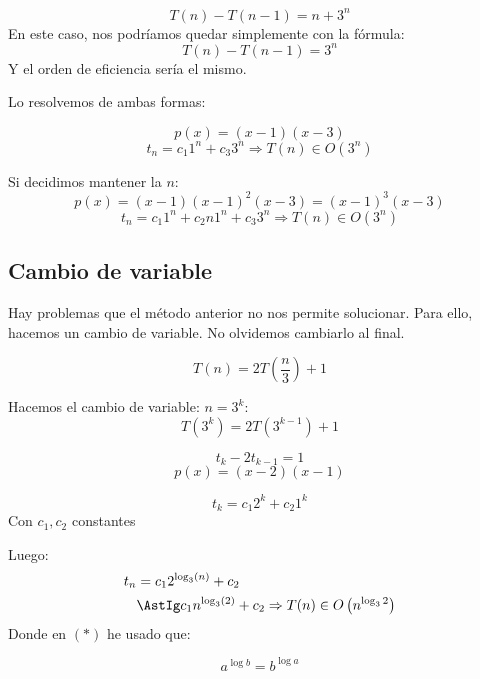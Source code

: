 \begin{ejemplo}
\begin{equation*}
    T(n) - T(n-1) = n+3^n
\end{equation*}
En este caso, nos podríamos quedar simplemente con la fórmula:
\begin{equation*}
    T(n) - T(n-1) = 3^n
\end{equation*}
Y el orden de eficiencia sería el mismo.

Lo resolvemos de ambas formas:

\begin{equation*}
    p(x) = (x-1)(x-3)
\end{equation*}
\begin{equation*}
    t_n = c_1 1^n + c_3 3^n \Rightarrow T(n) \in O(3^n)
\end{equation*}

Si decidimos mantener la $n$:
\begin{equation*}
    p(x) = (x-1)(x-1)^2 (x-3) = (x-1)^3(x-3)
\end{equation*}
\begin{equation*}
    t_n = c_1 1^n + c_2 n 1^n + c_3 3^n \Rightarrow T(n) \in O(3^n)
\end{equation*}
\end{ejemplo}

\subsection{Cambio de variable}
Hay problemas que el método anterior no nos permite solucionar. Para ello, hacemos un cambio de variable. No olvidemos cambiarlo al final.

\begin{ejemplo}
\begin{equation*}
    T(n) = 2T\left(\dfrac{n}{3}\right)+1
\end{equation*}

Hacemos el cambio de variable: $n = 3^k$:
\begin{equation*}
    T(3^k) = 2T(3^{k-1})+1
\end{equation*}

\begin{equation*}
    t_k - 2t_{k-1} = 1
\end{equation*}
\begin{equation*}
    p(x) = (x-2)(x-1)
\end{equation*}

\begin{equation*}
    t_k = c_1 2^k + c_2 1^k
\end{equation*}
Con $c_1, c_2$ constantes

Luego:
\begin{align*}
    t_n &= c_1 2^{\log_3(n)} + c_2\\
    &\AstIg c_1 n^{\log_3(2)} + c_2 \Rightarrow T(n) \in O\left(n^{\log_3 2}\right)
\end{align*}
Donde en $(\ast)$ he usado que:

\begin{equation*}
    a^{\log b} = b^{\log a}
\end{equation*}
\end{ejemplo}

